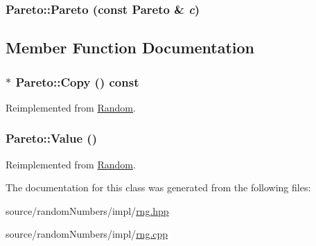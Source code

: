 \hypertarget{classPareto_b22f1cbfb9a0ac6fe8a73c29dd397d15}{
\subsubsection[{Pareto}]{\setlength{\rightskip}{0pt plus 5cm}Pareto::Pareto (const {\bf Pareto} \& {\em c})}}
\label{classPareto_b22f1cbfb9a0ac6fe8a73c29dd397d15}




\subsection{Member Function Documentation}
\hypertarget{classPareto_ec16a6e0b598846a9af58037ea5417d4}{
\subsubsection[{Copy}]{ $\ast$ Pareto::Copy () const}}
\label{classPareto_ec16a6e0b598846a9af58037ea5417d4}




Reimplemented from \hyperlink{classRandom_22b2951acd2008e8ff58fae434ab7ac5}{Random}.\hypertarget{classPareto_c92998c5176de1ee80e64302ce2eec73}{
\subsubsection[{Value}]{ Pareto::Value ()}}
\label{classPareto_c92998c5176de1ee80e64302ce2eec73}




Reimplemented from \hyperlink{classRandom_4d1c2876c5c78104186e241209d0e11e}{Random}.

The documentation for this class was generated from the following files:\begin{CompactItemize}
\item 
source/randomNumbers/impl/\hyperlink{rng_8hpp}{rng.hpp}\item 
source/randomNumbers/impl/\hyperlink{rng_8cpp}{rng.cpp}\end{CompactItemize}
